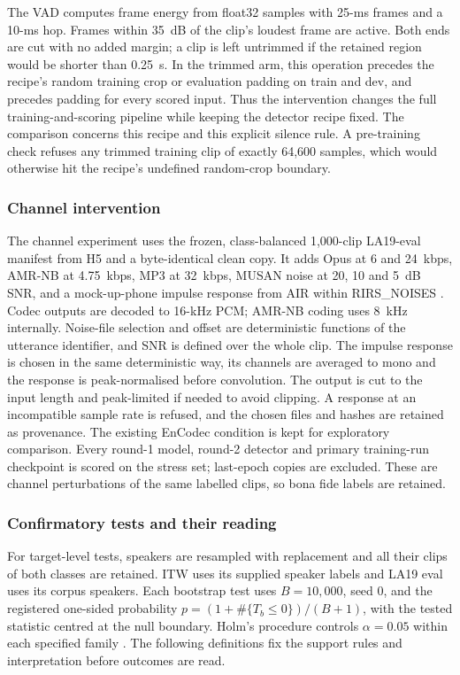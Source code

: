 The VAD computes frame energy from float32 samples with 25-ms frames and a 10-ms hop. Frames within
35~dB of the clip's loudest frame are active. Both ends are cut with no added margin; a clip is left
untrimmed if the retained region would be shorter than 0.25~s. In the trimmed arm, this operation
precedes the recipe's random training crop or evaluation padding on train and dev, and precedes
padding for every scored input. Thus the intervention changes the full training-and-scoring pipeline
while keeping the detector recipe fixed. The comparison concerns this recipe and this explicit
silence rule. A pre-training check refuses any trimmed training clip of exactly 64,600 samples,
which would otherwise hit the recipe's undefined random-crop boundary.

\subsubsection{Channel intervention}
The channel experiment uses the frozen, class-balanced 1,000-clip LA19-eval manifest from H5 and a
byte-identical clean copy. It adds Opus at 6 and 24~kbps, AMR-NB at 4.75~kbps, MP3 at 32~kbps,
MUSAN noise \citep{snyder15_musan} at 20, 10 and 5~dB SNR, and a mock-up-phone impulse response
from AIR within RIRS\_NOISES \citep{jeub09_air,ko17_rirs}. Codec outputs are decoded to 16-kHz PCM;
AMR-NB coding uses 8~kHz internally. Noise-file selection and offset are deterministic functions of
the utterance identifier, and SNR is defined over the whole clip. The impulse response is chosen in
the same deterministic way, its channels are averaged to mono and the response is peak-normalised
before convolution. The output is cut to the input length and peak-limited if needed to avoid clipping.
A response at an incompatible sample rate is refused,
and the chosen files and hashes are retained as provenance. The existing EnCodec condition is kept
for exploratory comparison. Every round-1 model, round-2 detector and primary training-run checkpoint
is scored on the stress set; last-epoch copies are excluded. These are channel perturbations of the
same labelled clips, so bona fide labels are retained.

\subsubsection{Confirmatory tests and their reading}
For target-level tests, speakers are resampled with replacement and all their clips of both classes
are retained. ITW uses its supplied speaker labels and LA19 eval uses its corpus speakers. Each
bootstrap test uses \(B=10{,}000\), seed 0, and the registered one-sided probability
\(p=(1+\#\{T_b\leq0\})/(B+1)\), with the tested statistic centred at the null boundary.
Holm's procedure controls \(\alpha=0.05\) within each specified family \citep{holm79_holm}.
The following definitions fix the support rules and interpretation before outcomes are read.

